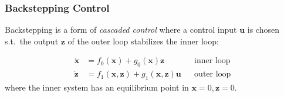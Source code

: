 \subsubsection{Backstepping Control}
Backstepping is a form of \textit{cascaded control} where a control input $\mathbf{u}$ is chosen s.t.\ the output $\mathbf{z}$ of the outer loop stabilizes the inner loop:

\noindent\begin{align*}
    \dot{\mathbf{x}} & = f_0(\mathbf{x}) + g_0(\mathbf{x})\mathbf{z}                         &  & \text{inner loop} \\
    \dot{\mathbf{z}} & = f_1(\mathbf{x},\mathbf{z}) + g_1(\mathbf{x}, \mathbf{z}) \mathbf{u} &  & \text{outer loop}
\end{align*}
where the inner system has an equilibrium point in $\mathbf{x}=0, \mathbf{z}=0$.

